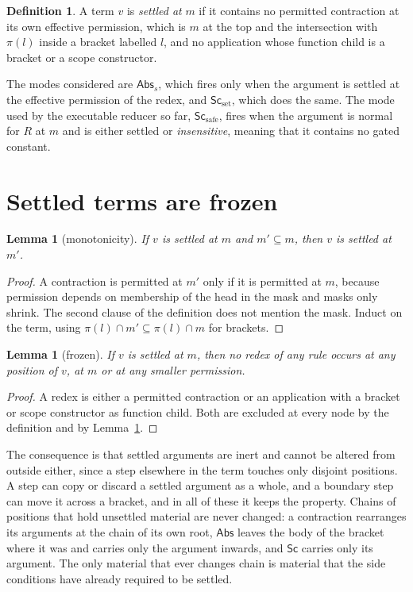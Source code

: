 \documentclass[11pt]{article}
\newtheorem{lemma}[theorem]{Lemma}
\theoremstyle{definition}
\newtheorem{definition}[theorem]{Definition}
\newcommand{\Sc}{\mathsf{Sc}}
\newcommand{\Abs}{\mathsf{Abs}}
\begin{document}
\begin{definition}
A term $v$ is \emph{settled at} $m$ if it contains no permitted contraction at its own effective permission, which is $m$ at the top and the intersection with $\pi(l)$ inside a bracket labelled $l$, and no application whose function child is a bracket or a scope constructor.
\end{definition}

The modes considered are $\Abs_s$, which fires only when the argument is settled at the effective permission of the redex, and $\Sc_{\mathrm{set}}$, which does the same. The mode used by the executable reducer so far, $\Sc_{\mathrm{safe}}$, fires when the argument is normal for $R$ at $m$ and is either settled or \emph{insensitive}, meaning that it contains no gated constant.

\section{Settled terms are frozen}

\begin{lemma}[monotonicity]\label{lem:mono}
If $v$ is settled at $m$ and $m'\subseteq m$, then $v$ is settled at $m'$.
\end{lemma}
\begin{proof}
A contraction is permitted at $m'$ only if it is permitted at $m$, because permission depends on membership of the head in the mask and masks only shrink. The second clause of the definition does not mention the mask. Induct on the term, using $\pi(l)\cap m'\subseteq\pi(l)\cap m$ for brackets.
\end{proof}

\begin{lemma}[frozen]\label{lem:frozen}
If $v$ is settled at $m$, then no redex of any rule occurs at any position of $v$, at $m$ or at any smaller permission.
\end{lemma}
\begin{proof}
A redex is either a permitted contraction or an application with a bracket or scope constructor as function child. Both are excluded at every node by the definition and by Lemma~\ref{lem:mono}.
\end{proof}

The consequence is that settled arguments are inert and cannot be altered from outside either, since a step elsewhere in the term touches only disjoint positions. A step can copy or discard a settled argument as a whole, and a boundary step can move it across a bracket, and in all of these it keeps the property. Chains of positions that hold unsettled material are never changed: a contraction rearranges its arguments at the chain of its own root, $\Abs$ leaves the body of the bracket where it was and carries only the argument inwards, and $\Sc$ carries only its argument. The only material that ever changes chain is material that the side conditions have already required to be settled.
\end{document}
